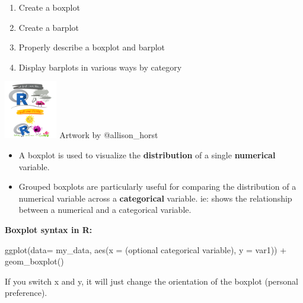 \documentclass[
  letterpaper,
  DIV=11,
  numbers=noendperiod]{scrreprt}
\newenvironment{Shaded}{\begin{snugshade}}{\end{snugshade}}
\newcommand{\AttributeTok}[1]{\textcolor[rgb]{0.40,0.45,0.13}{#1}}
\newcommand{\FunctionTok}[1]{\textcolor[rgb]{0.28,0.35,0.67}{#1}}
\newcommand{\NormalTok}[1]{\textcolor[rgb]{0.00,0.23,0.31}{#1}}
\newcommand{\SpecialCharTok}[1]{\textcolor[rgb]{0.37,0.37,0.37}{#1}}
\providecommand{\tightlist}{%
  \setlength{\itemsep}{0pt}\setlength{\parskip}{0pt}}\usepackage{longtable,booktabs,array}
\begin{document}
\begin{tcolorbox}[enhanced jigsaw, breakable, colback=white, bottomrule=.15mm, leftrule=.75mm, colframe=quarto-callout-note-color-frame, arc=.35mm, rightrule=.15mm, toprule=.15mm, left=2mm, opacityback=0]

\begin{enumerate}
\def\labelenumi{\arabic{enumi}.}
\tightlist
\item
  Create a boxplot
\item
  Create a barplot
\item
  Properly describe a boxplot and barplot
\item
  Display barplots in various ways by category
\end{enumerate}

\includegraphics[width=\textwidth,height=1in]{images/images_horst/r_first_then.png}
Artwork by @allison\_horst

\end{tcolorbox}

\begin{tcolorbox}[enhanced jigsaw, breakable, colback=white, bottomrule=.15mm, leftrule=.75mm, colframe=quarto-callout-note-color-frame, arc=.35mm, rightrule=.15mm, toprule=.15mm, left=2mm, opacityback=0]

\begin{itemize}
\item
  A boxplot is used to visualize the \textbf{distribution} of a single
  \textbf{numerical} variable.
\item
  Grouped boxplots are particularly useful for comparing the
  distribution of a numerical variable across a \textbf{categorical}
  variable. ie: shows the relationship between a numerical and a
  categorical variable.
\end{itemize}

\textbf{Boxplot syntax in R:}

\begin{Shaded}
\begin{Highlighting}[]
\FunctionTok{ggplot}\NormalTok{(}\AttributeTok{data=}\NormalTok{ my\_data, }\FunctionTok{aes}\NormalTok{(}\AttributeTok{x =}\NormalTok{ (optional categorical variable),  }\AttributeTok{y =}\NormalTok{ var1)) }\SpecialCharTok{+}
  \FunctionTok{geom\_boxplot}\NormalTok{()}
\end{Highlighting}
\end{Shaded}

If you switch x and y, it will just change the orientation of the
boxplot (personal preference).

\end{tcolorbox}
\end{document}

